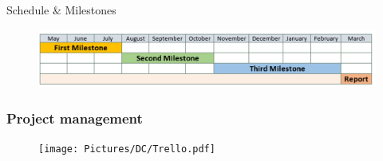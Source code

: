 \begin{frame}{Schedule \& Milestones}
\begin{figure}
	\includegraphics[scale=0.55]{Pictures/FirstHalf/timeline.png}
	\end{figure}
\end{frame}



\begin{frame}

	\frametitle{Project management}

	\begin{figure}
	\texttt{[image: Pictures/DC/Trello.pdf]}
	\end{figure}
	
\end{frame}